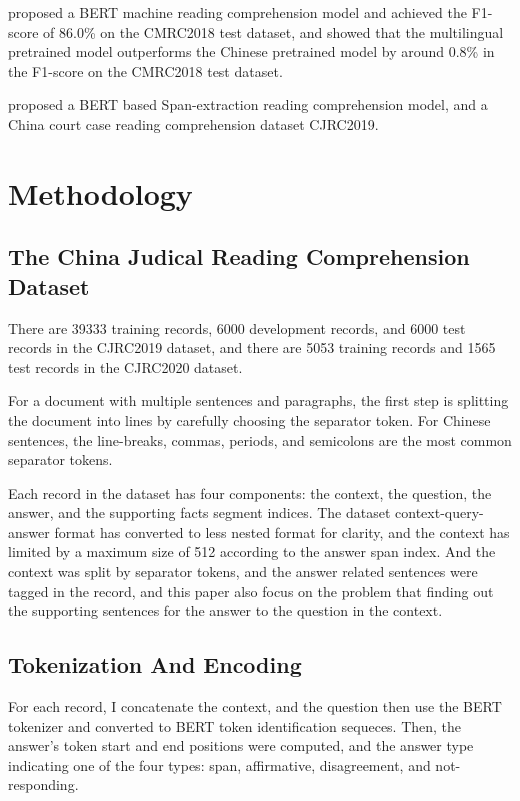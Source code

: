 \documentclass[11pt,a4paper]{article}
\begin{document}
  \citet{cui2019span} proposed a BERT machine reading comprehension model and achieved the F1-score of 86.0\% on the CMRC2018 test dataset,
and showed that the multilingual pretrained model outperforms the Chinese pretrained model by around 0.8\% in the F1-score on the CMRC2018 test dataset.

  \citet{duan2019cjrc} proposed a BERT based Span-extraction reading comprehension model, and a China court case reading comprehension dataset CJRC2019.

\section{Methodology}
\label{sec:hireachy}

\subsection{The China Judical Reading Comprehension Dataset}

    There are 39333 training records, 6000 development records, and 6000 test records in the CJRC2019 dataset,
and there are 5053 training records and 1565 test records in the CJRC2020 dataset.

    For a document with multiple sentences and paragraphs, the first step is splitting the document into lines by carefully choosing the separator token.
    For Chinese sentences, the line-breaks, commas, periods, and semicolons are the most common separator tokens.

    Each record in the dataset has four components: the context, the question, the answer, and the supporting facts segment indices.
    The dataset context-query-answer format has converted to less nested format for clarity, and the context has limited by a maximum size of 512 according to the answer span index.
    And the context was split by separator tokens, and the answer related sentences were tagged in the record,
    and this paper also focus on the problem that finding out the supporting sentences for the answer to the question in the context.


\subsection{Tokenization And Encoding}

For each record, I concatenate the context, and the question then use the BERT tokenizer and converted to BERT token identification sequeces.
Then, the answer's token start and end positions were computed, and the answer type indicating one of the four types: span, affirmative, disagreement, and not-responding.
\end{document}
